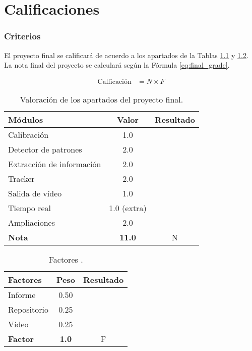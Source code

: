 \chapter{\textbf{Calificaciones}}
\label{chapter:calificaciones}

\subsection*{Criterios}
{}
\vspace{5mm}


El proyecto final se calificará de acuerdo a los apartados de la Tablas \ref{table:evaluacionI} y \ref{table:evaluacionII}. La nota final del proyecto se calculará según la Fórmula \ref{eq:final_grade}.

\begin{align}
     \text{Calficación} &= N \times F
    \label{eq:final_grade}
\end{align}

\begin{table}[h!]
    \centering
    \begin{tabular}{|l|c|c|}
    \hline
    \textbf{Módulos} & \textbf{Valor} & \textbf{Resultado} \\
    \hline
    Calibración & 1.0 & \\
    \hline
    Detector de patrones & 2.0 & \\
    \hline
    Extracción de información & 2.0 & \\
    \hline
    Tracker & 2.0 & \\
    \hline
    Salida de vídeo & 1.0 & \\
    \hline
    Tiempo real & 1.0 (extra) & \\
    \hline
    Ampliaciones & 2.0 & \\
    \hline
    \hline
    \textbf{Nota} & \textbf{11.0} & N \\
    \hline
    \end{tabular}
    \caption{Valoración de los apartados del proyecto final.}
    \label{table:evaluacionI}
\end{table}

\begin{table}[h!]
    \centering
    \begin{tabular}{|l|c|c|}
    \hline
    \textbf{Factores} & \textbf{Peso} & \textbf{Resultado} \\
    \hline
    Informe & 0.50 & \\
    \hline
    Repositorio & 0.25 & \\
    \hline
    Vídeo & 0.25 & \\
    \hline
    \hline
    \textbf{Factor} & \textbf{1.0} & F\\
    \hline
    \end{tabular}
    \caption{Factores .}
    \label{table:evaluacionII}
\end{table}